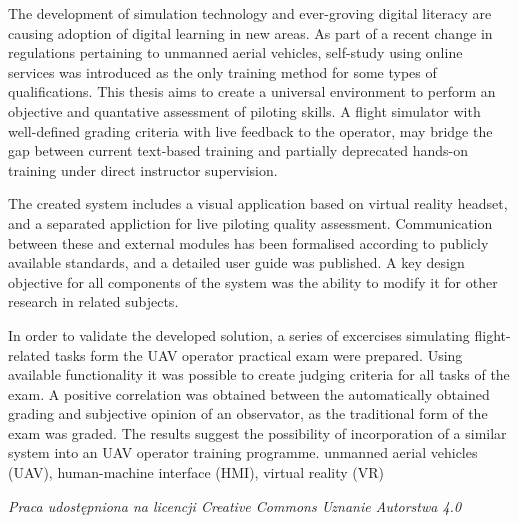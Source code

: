 \documentclass[
    a4paper,
    left=25mm,         %
    right=25mm,        %
    top=25mm,          %
    bottom=25mm,         %
    bindingoffset=5mm,  %
    nohyphenation=false %
]{src/wut-thesis}
\begin{document}
\newpage
\abstract The development of simulation technology and ever-groving digital literacy are causing adoption of digital learning in new areas. As part of a recent change in regulations pertaining to unmanned aerial vehicles, self-study using online services was introduced as the only training method for some types of qualifications. This thesis aims to create a universal environment to perform an objective and quantative assessment of piloting skills. A flight simulator with well-defined grading criteria with live feedback to the operator, may bridge the gap between current text-based training and partially deprecated hands-on training under direct instructor supervision.

The created system includes a visual application based on virtual reality headset, and a separated appliction for live piloting quality assessment. Communication between these and external modules has been formalised according to publicly available standards, and a detailed user guide was published. A key design objective for all components of the system was the ability to modify it for other research in related subjects.

In order to validate the developed solution, a series of excercises simulating flight-related tasks form the UAV operator practical exam were prepared. Using available functionality it was possible to create judging criteria for all tasks of the exam. A positive correlation was obtained between the automatically obtained grading and subjective opinion of an observator, as the traditional form of the exam was graded. The results suggest the possibility of incorporation of a similar system into an UAV operator training programme.
\keywords unmanned aerial vehicles (UAV), human-machine interface (HMI), virtual reality (VR)

\cleardoublepage  %
\pagestyle{plain}
\makeauthorship

\cleardoublepage %
{
  \noindent
  \emph{Praca udostępniona na licencji Creative Commons Uznanie Autorstwa 4.0\cite{lic:ccby}}
}
\tableofcontents

\cleardoublepage %
\pagestyle{headings}
\end{document}

